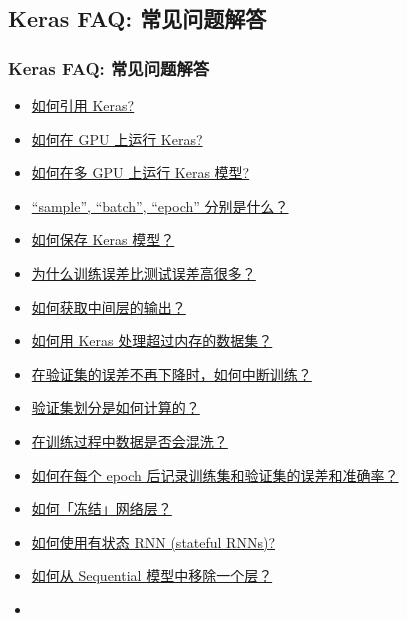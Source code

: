 \subsection{Keras FAQ: 常见问题解答}\label{keras-faq}

\subsubsection{Keras FAQ: 常见问题解答}
\begin{itemize}
\tightlist
\item
    \hyperref[how-should-i-cite-keras]{如何引用 Keras?}
\item
    \hyperref[how-can-i-run-keras-on-gpu]{如何在 GPU 上运行 Keras?}
\item
    \hyperref[how-can-i-run-a-keras-model-on-multiple-gpus]{如何在多 GPU 上运行 Keras 模型?}
\item
    \hyperref[what-does-sample-batch-epoch-mean]{``sample'', ``batch'', ``epoch'' 分别是什么？}
\item
    \hyperref[how-can-i-save-a-keras-model]{如何保存 Keras 模型？}
\item
    \hyperref[why-is-the-training-loss-much-higher-than-the-testing-loss]{为什么训练误差比测试误差高很多？}
\item
    \hyperref[how-can-i-obtain-the-output-of-an-intermediate-layer]{如何获取中间层的输出？}
\item
    \hyperref[how-can-i-use-keras-with-datasets-that-dont-fit-in-memory]{如何用 Keras 处理超过内存的数据集？}
\item
    \hyperref[how-can-i-interrupt-training-when-the-validation-loss-isnt-decreasing-anymore]{在验证集的误差不再下降时，如何中断训练？}
\item
    \hyperref[how-is-the-validation-split-computed]{验证集划分是如何计算的？}
\item
    \hyperref[is-the-data-shuffled-during-training]{在训练过程中数据是否会混洗？}
\item
    \hyperref[how-can-i-record-the-training-validation-loss-accuracy-at-each-epoch]{如何在每个 epoch 后记录训练集和验证集的误差和准确率？}
\item
    \hyperref[how-can-i-freeze-keras-layers]{如何「冻结」网络层？}
\item
    \hyperref[how-can-i-use-stateful-rnns]{如何使用有状态 RNN (stateful RNNs)?}
\item
    \hyperref[how-can-i-remove-a-layer-from-a-sequential-model]{如何从 Sequential 模型中移除一个层？}
\item

\end{itemize}
